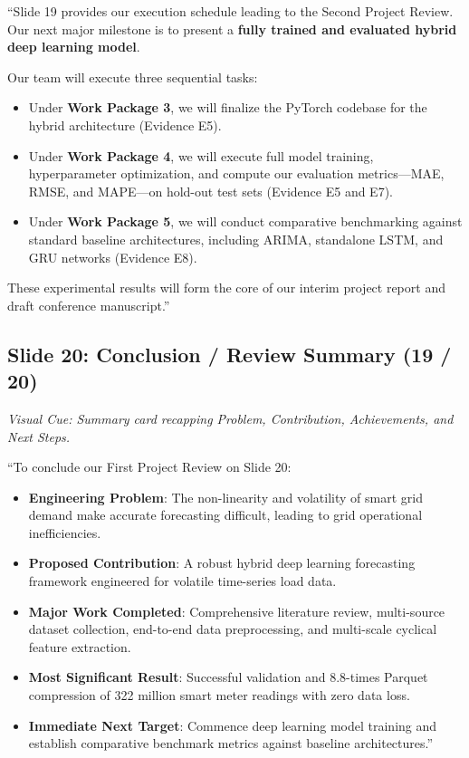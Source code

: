 \documentclass[11pt,a4paper]{article}
\begin{document}
\begin{scriptbox}
``Slide 19 provides our execution schedule leading to the Second Project Review. Our next major milestone is to present a \textbf{fully trained and evaluated hybrid deep learning model}.

Our team will execute three sequential tasks:
\begin{itemize}[leftmargin=15pt,itemsep=2pt]
    \item Under \textbf{Work Package 3}, we will finalize the PyTorch codebase for the hybrid architecture (Evidence E5).
    \item Under \textbf{Work Package 4}, we will execute full model training, hyperparameter optimization, and compute our evaluation metrics---MAE, RMSE, and MAPE---on hold-out test sets (Evidence E5 and E7).
    \item Under \textbf{Work Package 5}, we will conduct comparative benchmarking against standard baseline architectures, including ARIMA, standalone LSTM, and GRU networks (Evidence E8).
\end{itemize}
These experimental results will form the core of our interim project report and draft conference manuscript.''
\end{scriptbox}

\subsection{Slide 20: Conclusion / Review Summary (19 / 20)}
\textit{Visual Cue: Summary card recapping Problem, Contribution, Achievements, and Next Steps.}

\begin{scriptbox}
``To conclude our First Project Review on Slide 20:
\begin{itemize}[leftmargin=15pt,itemsep=2pt]
    \item \textbf{Engineering Problem}: The non-linearity and volatility of smart grid demand make accurate forecasting difficult, leading to grid operational inefficiencies.
    \item \textbf{Proposed Contribution}: A robust hybrid deep learning forecasting framework engineered for volatile time-series load data.
    \item \textbf{Major Work Completed}: Comprehensive literature review, multi-source dataset collection, end-to-end data preprocessing, and multi-scale cyclical feature extraction.
    \item \textbf{Most Significant Result}: Successful validation and 8.8-times Parquet compression of 322 million smart meter readings with zero data loss.
    \item \textbf{Immediate Next Target}: Commence deep learning model training and establish comparative benchmark metrics against baseline architectures.''
\end{itemize}
\end{scriptbox}
\end{document}
